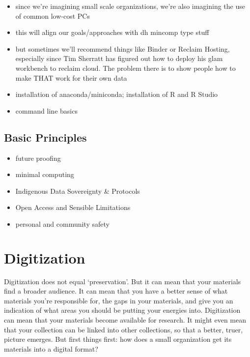 \documentclass[
]{book}
\providecommand{\tightlist}{%
  \setlength{\itemsep}{0pt}\setlength{\parskip}{0pt}}
\begin{document}
\begin{itemize}
\tightlist
\item
  since we're imagining small scale organizations, we're also imagining the use of common low-cost PCs
\item
  this will align our goals/approaches with dh mincomp type stuff
\item
  but sometimes we'll recommend things like Binder or Reclaim Hosting, especially since Tim Sherratt has figured out how to deploy his glam workbench to reclaim cloud. The problem there is to show people how to make THAT work for their own data
\item
  installation of anaconda/miniconda; installation of R and R Studio
\item
  command line basics
\end{itemize}

\hypertarget{basic-principles}{%
\section{Basic Principles}\label{basic-principles}}

\begin{itemize}
\tightlist
\item
  future proofing
\item
  minimal computing
\item
  Indigenous Data Sovereignty \& Protocols
\item
  Open Access and Sensible Limitations
\item
  personal and community safety
\end{itemize}

\hypertarget{digitization}{%
\chapter{Digitization}\label{digitization}}

Digitization does not equal `preservation'. But it can mean that your materials find a broader audience. It can mean that you have a better sense of what materials you're responsible for, the gaps in your materials, and give you an indication of what areas you should be putting your energies into. Digitization can mean that your materials become available for research. It might even mean that your collection can be linked into other collections, so that a better, truer, picture emerges. But first things first: how does a small organization get its materials into a digital format?
\end{document}
